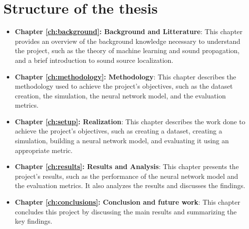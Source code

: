 \section{Structure of the thesis}


\begin{itemize}
    \item \textbf{Chapter \ref{ch:background}: Background and Litterature}: This chapter provides an overview of the background knowledge necessary to understand the project, such as the theory of machine learning and sound propagation, and a brief introduction to sound source localization.
    \item \textbf{Chapter \ref{ch:methodology}: Methodology}: This chapter describes the methodology used to achieve the project's objectives, such as the dataset creation, the simulation, the neural network model, and the evaluation metrics.
    \item \textbf{Chapter \ref{ch:setup}: Realization}: This chapter describes the work done to achieve the project's objectives, such as creating a dataset, creating a simulation, building a neural network model, and evaluating it using an appropriate metric.
    \item \textbf{Chapter \ref{ch:results}: Results and Analysis}: This chapter presents the project's results, such as the performance of the neural network model and the evaluation metrics. It also analyzes the results and discusses the findings.
    \item \textbf{Chapter \ref{ch:conclusions}: Conclusion and future work}: This chapter concludes this project by discussing the main results and summarizing the key findings. 
\end{itemize}

